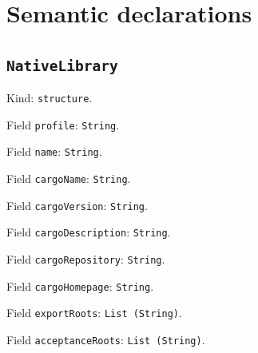 \documentclass[11pt]{article}
\begin{document}
\section*{Semantic declarations}
\subsection*{\texttt{NativeLibrary}}
\noindent Kind: \texttt{structure}.\par
\noindent Field \texttt{profile}: \texttt{String}.\par
\noindent Field \texttt{name}: \texttt{String}.\par
\noindent Field \texttt{cargoName}: \texttt{String}.\par
\noindent Field \texttt{cargoVersion}: \texttt{String}.\par
\noindent Field \texttt{cargoDescription}: \texttt{String}.\par
\noindent Field \texttt{cargoRepository}: \texttt{String}.\par
\noindent Field \texttt{cargoHomepage}: \texttt{String}.\par
\noindent Field \texttt{exportRoots}: \texttt{List (String)}.\par
\noindent Field \texttt{acceptanceRoots}: \texttt{List (String)}.\par
\end{document}

